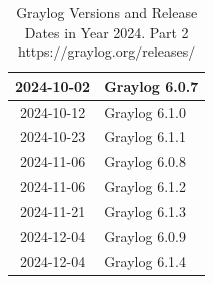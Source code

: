 \documentclass[../main.tex]{subfiles}
\begin{document}
\begin{table}[h]
\begin{minipage}{0.45\textwidth}
\begin{tabular}{|c|l|}
    2024-10-02 & Graylog 6.0.7 \\ \hline  
    2024-10-12 & Graylog 6.1.0 \\ \hline  
    2024-10-23 & Graylog 6.1.1 \\ \hline  
    2024-11-06 & Graylog 6.0.8 \\ \hline  
    2024-11-06 & Graylog 6.1.2 \\ \hline  
    2024-11-21 & Graylog 6.1.3 \\ \hline  
    2024-12-04 & Graylog 6.0.9 \\ \hline  
    2024-12-04 & Graylog 6.1.4 \\ \hline  
\end{tabular}
\caption{Graylog Versions and Release Dates in Year 2024. Part 2 https://graylog.org/releases/}
\label{table:graylog_versions}
\end{minipage}
\end{table}
\end{document}
